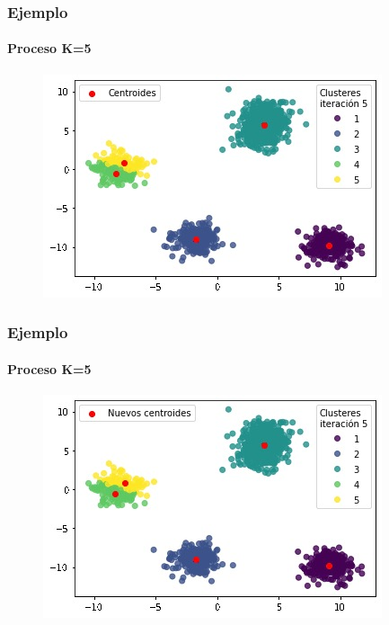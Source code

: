 \documentclass[
  shownotes,
  xcolor={svgnames},
  hyperref={colorlinks,citecolor=DarkBlue,linkcolor=DarkRed,urlcolor=DarkBlue}
  , aspectratio=169]{beamer}
\begin{document}
\begin{frame}
\frametitle{Ejemplo}
\framesubtitle{Proceso K=5}


\begin{figure}[H] \centering

    \centering
    \includegraphics[scale=.7]{figures/k5_7.jpg}
  \\
  \tiny
\end{figure}


\end{frame}
\begin{frame}
\frametitle{Ejemplo}
\framesubtitle{Proceso K=5}


\begin{figure}[H] \centering

    \centering
    \includegraphics[scale=.7]{figures/k5_8.jpg}
  \\
  \tiny
\end{figure}


\end{frame}
\end{document}

